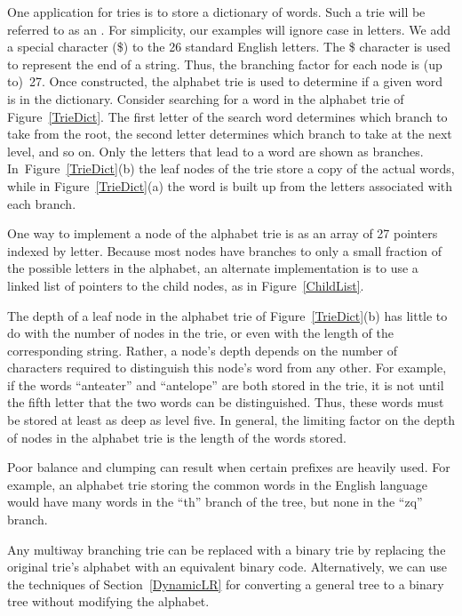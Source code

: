 One application for tries is to store a dictionary of words.
Such a trie will be referred to as an
.
For simplicity, our examples will ignore case in letters.
We add a special character (\$) to the 26 standard English letters.
The \$ character is used to represent the end of a string.
Thus, the branching factor for each node is (up to)~27.
Once constructed, the alphabet trie is used to determine if a given
word is in the dictionary.
Consider searching for a word in the alphabet trie of
Figure~\ref{TrieDict}.
The first letter of the search word determines which branch to take
from the root, the second letter determines which branch to take at
the next level, and so on.
Only the letters that lead to a word are shown as branches.
In~Figure~\ref{TrieDict}(b) the leaf nodes of the trie store a copy of
the actual words, while in Figure~\ref{TrieDict}(a) the word is built
up from the letters associated with each branch.

One way to implement a node of the alphabet trie is as an
array of 27 pointers indexed by letter.
Because most nodes have branches to only a small fraction of the
possible letters in the alphabet, an alternate implementation is to
use a linked list of pointers to the child nodes, as in
Figure~\ref{ChildList}.

The depth of a leaf node in the alphabet trie of
Figure~\ref{TrieDict}(b) has little to do with
the number of nodes in the trie, or even with the length of the
corresponding string.
Rather, a node's depth depends on the number of characters
required to distinguish this node's word from any other.
For example, if the words ``anteater'' and ``antelope''
are both stored in the trie, it is not until the fifth letter that
the two words can be distinguished.
Thus, these words must be stored at least as deep as level five.
In general, the limiting factor on the depth of nodes in the alphabet
trie is the length of the words stored.

Poor balance and clumping can result when certain prefixes are heavily
used.
For example, an alphabet trie storing the common words in the English
language would have many words in the ``th''
branch of the tree, but none in the ``zq'' branch.

Any multiway branching trie can be replaced with a binary
trie by replacing the original trie's alphabet with an equivalent
binary code.
Alternatively, we can use the techniques of Section~\ref{DynamicLR}
for converting a general tree to a binary tree without modifying the
alphabet.

